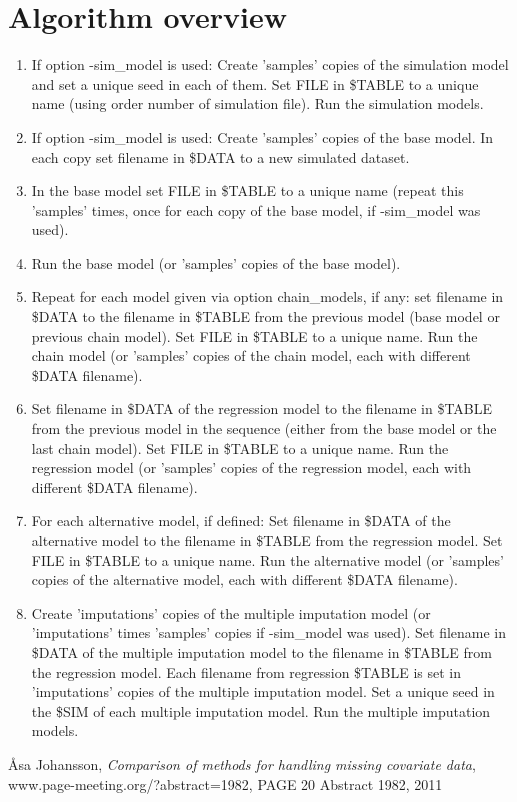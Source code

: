 \section{Algorithm overview}

\begin{enumerate}

\item If option -sim\_model is used: Create 'samples' copies of the simulation model and set a unique  seed in each of them. Set FILE in \$TABLE to a unique name (using order number of simulation file). Run the simulation models.
\item If option -sim\_model is used: Create 'samples' copies of the base model. In each copy set filename in \$DATA to a new simulated dataset.
\item In the base model set FILE in \$TABLE to a unique name (repeat this 'samples' times, once for each copy of the base model, if -sim\_model was used).
\item Run the base model (or 'samples' copies of the base model).
\item Repeat for each model given via option chain\_models, if any: set filename in \$DATA to the filename in \$TABLE from the previous model (base model or previous chain model). Set FILE in \$TABLE to a unique name. Run the chain model (or 'samples' copies of the chain model, each with different \$DATA filename).
\item Set filename in \$DATA of the regression model to the filename in \$TABLE from the previous model in the sequence (either from the base model or the last chain model). Set FILE in \$TABLE to a unique name. Run the regression model (or 'samples' copies of the regression model, each with different \$DATA filename).
\item For each alternative model, if defined: Set filename in \$DATA of the alternative model to the filename in \$TABLE from the regression model. Set FILE in \$TABLE to a unique name. Run the alternative model (or 'samples' copies of the alternative model, each with different \$DATA filename).
\item Create 'imputations' copies of the multiple imputation model (or 'imputations' times 'samples' copies if -sim\_model was used). Set filename in \$DATA of the multiple imputation model to the filename in \$TABLE from the regression model. Each filename from regression \$TABLE is set in 'imputations' copies of the multiple imputation model. Set a unique seed in the \$SIM of each multiple imputation model. Run the multiple imputation models.
\end{enumerate}



\begin{thebibliography}{1}

 Åsa Johansson, {\em Comparison of methods for handling missing covariate data}, www.page-meeting.org/?abstract=1982, PAGE 20 Abstract 1982, 2011
\end{thebibliography}


